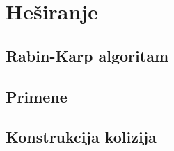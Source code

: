 \section{He\v siranje}

\subsection{Rabin-Karp algoritam}

\subsection{Primene}

\subsection{Konstrukcija kolizija}